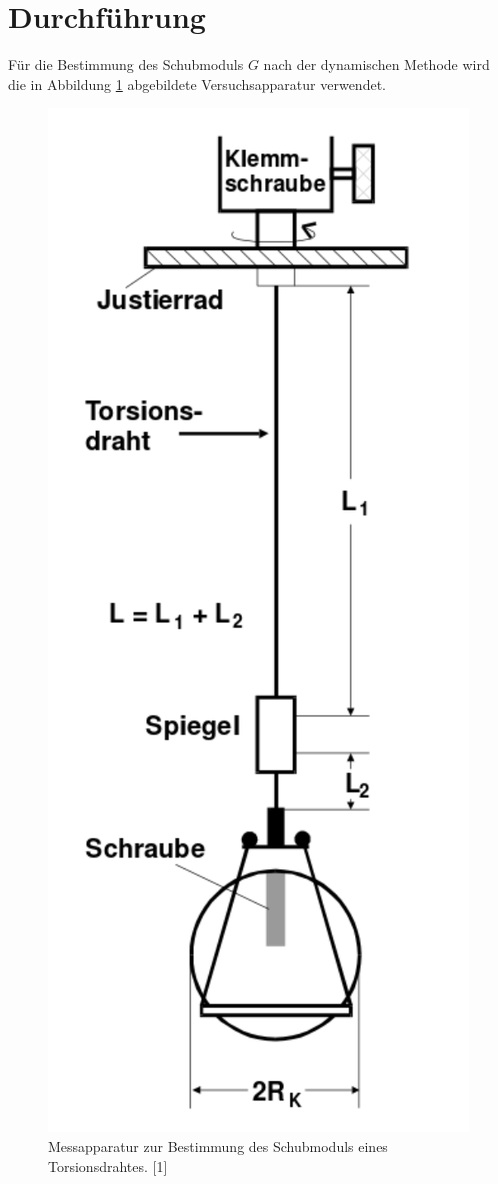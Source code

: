 \section{Durchführung}
\label{sec:Durchführung}

Für die Bestimmung des Schubmoduls $G$ nach der dynamischen Methode wird die in Abbildung \ref{fig:Aufbau} abgebildete
Versuchsapparatur verwendet. 

\begin{figure}
  \centering
  \includegraphics[scale=0.2]{content/Aufbau.png}
  \caption{Messapparatur zur Bestimmung des Schubmoduls eines Torsionsdrahtes. [1]}
  \label{fig:Aufbau}
\end{figure}

